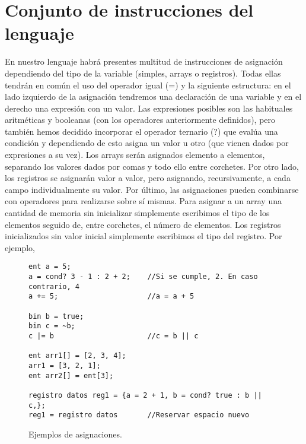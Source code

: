 \section*{Conjunto de instrucciones del lenguaje}
En nuestro lenguaje habrá presentes multitud de instrucciones de asignación
dependiendo del tipo de la variable (simples, arrays o registros). Todas ellas
tendrán en común el uso del operador igual (=) y la siguiente estructura: en el
lado izquierdo de la asignación tendremos una declaración de una variable y en
el derecho una expresión con un valor. Las expresiones posibles son las
habituales aritméticas y booleanas (con los operadores anteriormente definidos),
pero también hemos decidido incorporar el operador ternario (?) que evalúa una
condición y dependiendo de esto asigna un valor u otro (que vienen dados por
expresiones a su vez). Los arrays serán asignados elemento a elementos,
separando los valores dados por comas y todo ello entre corchetes. Por otro
lado, los registros se asignarán valor a valor, pero asignando, recursivamente,
a cada campo individualmente su valor. Por último, las asignaciones pueden
combinarse con operadores para realizarse sobre sí mismas. Para asignar a un
array una cantidad de memoria sin inicializar simplemente escribimos el tipo de
los elementos seguido de, entre corchetes, el número de elementos. Los
registros inicializados sin valor inicial simplemente escribimos el tipo del
registro. Por ejemplo,
\begin{figure}[H]
    \centering
    \begin{lstlisting}
ent a = 5;
a = cond? 3 - 1 : 2 + 2;    //Si se cumple, 2. En caso contrario, 4
a += 5;                     //a = a + 5

bin b = true;
bin c = ~b;
c |= b                      //c = b || c

ent arr1[] = [2, 3, 4];
arr1 = [3, 2, 1];
ent arr2[] = ent[3];

registro datos reg1 = {a = 2 + 1, b = cond? true : b || c,};
reg1 = registro datos       //Reservar espacio nuevo
    \end{lstlisting}
    \caption{Ejemplos de asignaciones.}
\end{figure}
